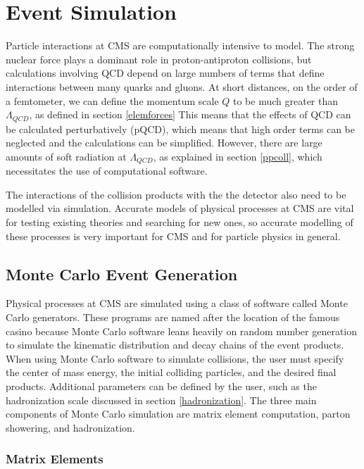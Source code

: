 \documentclass[oneside, letterpaper, oldfontcommands]{memoir}
\begin{document}
\chapter{Event Simulation}\label{eventsim}
\qquad Particle interactions at CMS are computationally intensive to model. The strong nuclear force plays a dominant role in proton-antiproton collisions, but calculations involving QCD depend on large numbers of terms 
that define interactions between many quarks and gluons. At short distances, on the order of a femtometer, we can define the momentum scale $Q$ to be much greater than $\Lambda_{QCD}$, as defined in section \ref{elemforces}  This means that the effects of QCD can be calculated perturbatively (pQCD), which means that high order terms can be neglected and the calculations can be simplified. However, there are large amounts of soft radiation at $\Lambda_{QCD}$, as explained in section \ref{ppcoll}, which necessitates the use of computational software.

\qquad The interactions of the collision products with the the detector also need to be modelled via simulation. Accurate models of physical processes at CMS are vital for testing existing theories and searching for new ones, so accurate modelling of these processes is very important for CMS and for particle physics in general.
   
\section{Monte Carlo Event Generation}\label{mcgen}
\qquad Physical processes at CMS are simulated using a class of software called Monte Carlo generators. These programs are named after the location of the famous casino because Monte Carlo software leans heavily on random number generation to simulate the kinematic distribution and decay chains of the event products. When using Monte Carlo software to simulate collisions, the user must specify the center of mass energy, the initial colliding particles, and the desired final products. Additional parameters can be defined by the user, such as the hadronization scale discussed in section \ref{hadronization}.  The three main components of Monte Carlo simulation are matrix element computation, parton showering, and hadronization. 


\subsection{Matrix Elements}\label{matrix}
\end{document}
